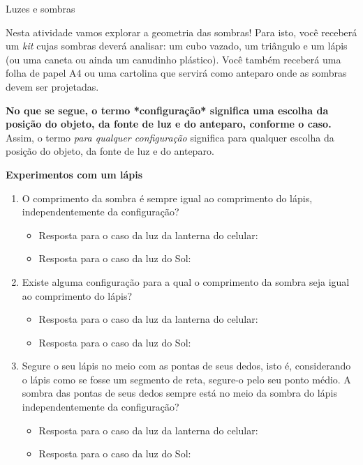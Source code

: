 \begin{task}{Luzes e sombras}

Nesta atividade vamos explorar a geometria das sombras! Para isto, você receberá um \emph{kit} cujas sombras deverá analisar: um cubo vazado, um triângulo e um lápis (ou uma caneta ou ainda um canudinho plástico). Você também receberá uma folha de papel A4 ou uma cartolina que servirá como anteparo onde as sombras devem ser projetadas.

\textbf{No que se segue, o termo *configuração* significa uma escolha da posição do objeto, da fonte de luz e do anteparo, conforme o caso.} Assim, o termo \emph{para qualquer configuração} significa para qualquer escolha da posição do objeto, da fonte de luz e do anteparo.

\textbf{Experimentos com um lápis}
\begin{enumerate}
\item {} 
O comprimento da sombra é sempre igual ao comprimento do lápis, independentemente da configuração?
\begin{itemize}
\item {} 
Resposta para o caso da luz da lanterna do celular:

\item {} 
Resposta para o caso da luz do Sol:

\end{itemize}

\item {} 
Existe alguma configuração para a qual o comprimento da sombra seja igual ao comprimento do lápis?
\begin{itemize}
\item {} 
Resposta para o caso da luz da lanterna do celular:

\item {} 
Resposta para o caso da luz do Sol:

\end{itemize}

\item {} 
Segure o seu lápis no meio com as pontas de seus dedos, isto é, considerando o lápis como se fosse um segmento de reta, segure-o pelo seu ponto médio. A sombra das pontas de seus dedos sempre está no meio da sombra do lápis independentemente da configuração?
\begin{itemize}
\item {} 
Resposta para o caso da luz da lanterna do celular:

\item {} 
Resposta para o caso da luz do Sol:


\end{itemize}
\end{enumerate}
\end{task}
